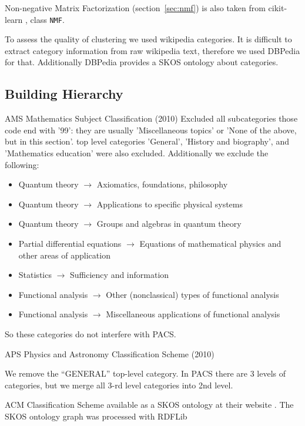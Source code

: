 Non-negative Matrix Factorization (section~\ref{sec:nmf}) is also taken from 
cikit-learn \cite{scikit-learn}, class \verb|NMF|.


To assess the quality of clustering we used wikipedia categories. 
It is difficult to extract category information from raw wikipedia text, therefore
we used DBPedia \cite{bizer2009dbpedia} for that. Additionally 
DBPedia provides a SKOS ontology about categories. 


\subsection{Building Hierarchy} 

AMS Mathematics Subject Classification (2010) \cite{ams2010msc}
Excluded all subcategories those code end with '99': they are 
usually 'Miscellaneous topics' or 'None of the above, but in this section'. 
top level categories 'General', 'History and biography', and 'Mathematics education'
were also excluded. 
Additionally we exclude the following: 

\begin{itemize}
\item Quantum theory $\to$ Axiomatics, foundations, philosophy
\item Quantum theory $\to$ Applications to specific physical systems
\item Quantum theory $\to$ Groups and algebras in quantum theory
\item Partial differential equations $\to$ Equations of mathematical physics and other areas of application
\item Statistics $\to$ Sufficiency and information
\item Functional analysis $\to$ Other (nonclassical) types of functional analysis
\item Functional analysis $\to$ Miscellaneous applications of functional analysis
\end{itemize}

So these categories do not interfere with PACS. 


APS Physics and Astronomy Classification Scheme (2010) \cite{aps2010pacs}

We remove the ``GENERAL'' top-level category. 
In PACS there are 3 levels of categories, but we merge all 3-rd level categories into 
2nd level.

ACM Classification Scheme \cite{rous2012acm} available as a SKOS \cite{miles2005skos} ontology 
at their website \cite{amc2012ccs}. The SKOS ontology graph was processed with RDFLib \cite{rdflib}

